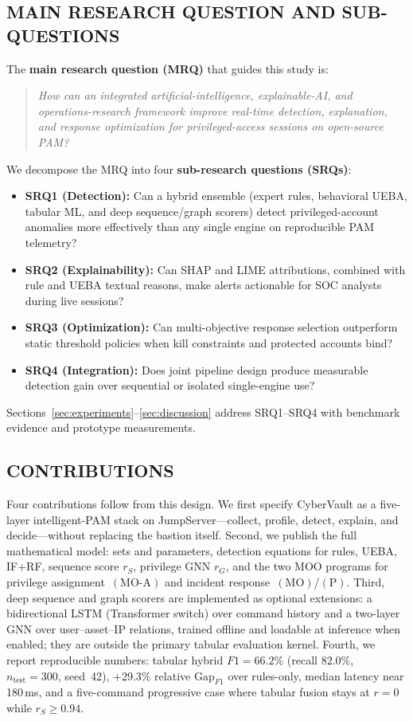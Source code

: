 \documentclass{ieeeaccess}
\begin{document}
\subsection{MAIN RESEARCH QUESTION AND SUB-QUESTIONS}
The \textbf{main research question (MRQ)} that guides this study is:
\begin{quote}
\textit{How can an integrated artificial-intelligence, explainable-AI, and operations-research framework improve real-time detection, explanation, and response optimization for privileged-access sessions on open-source PAM?}
\end{quote}
We decompose the MRQ into four \textbf{sub-research questions (SRQs)}:
\begin{itemize}
\item \textbf{SRQ1 (Detection):} Can a hybrid ensemble (expert rules, behavioral UEBA, tabular ML, and deep sequence/graph scorers) detect privileged-account anomalies more effectively than any single engine on reproducible PAM telemetry?
\item \textbf{SRQ2 (Explainability):} Can SHAP and LIME attributions, combined with rule and UEBA textual reasons, make alerts actionable for SOC analysts during live sessions?
\item \textbf{SRQ3 (Optimization):} Can multi-objective response selection outperform static threshold policies when kill constraints and protected accounts bind?
\item \textbf{SRQ4 (Integration):} Does joint pipeline design produce measurable detection gain over sequential or isolated single-engine use?
\end{itemize}
Sections~\ref{sec:experiments}--\ref{sec:discussion} address SRQ1--SRQ4 with benchmark evidence and prototype measurements.

\subsection{CONTRIBUTIONS}
Four contributions follow from this design.
We first specify CyberVault as a five-layer intelligent-PAM stack on JumpServer---collect, profile, detect, explain, and decide---without replacing the bastion itself.
Second, we publish the full mathematical model: sets and parameters, detection equations for rules, UEBA, IF+RF, sequence score $r_S$, privilege GNN $r_G$, and the two MOO programs for privilege assignment~$(\mathrm{MO}\text{-}\mathrm{A})$ and incident response~$(\mathrm{MO})$/$(\mathrm{P})$.
Third, deep sequence and graph scorers are implemented as optional extensions: a bidirectional LSTM (Transformer switch) over command history and a two-layer GNN over user--asset--IP relations, trained offline and loadable at inference when enabled; they are outside the primary tabular evaluation kernel.
Fourth, we report reproducible numbers: tabular hybrid $F1=66.2\%$ (recall $82.0\%$, $n_{\mathrm{test}}=300$, seed~42), +29.3\% relative $\mathrm{Gap}_{F1}$ over rules-only, median latency near 180\,ms, and a five-command progressive case where tabular fusion stays at $r{=}0$ while $r_S\geq 0.94$.
\end{document}
